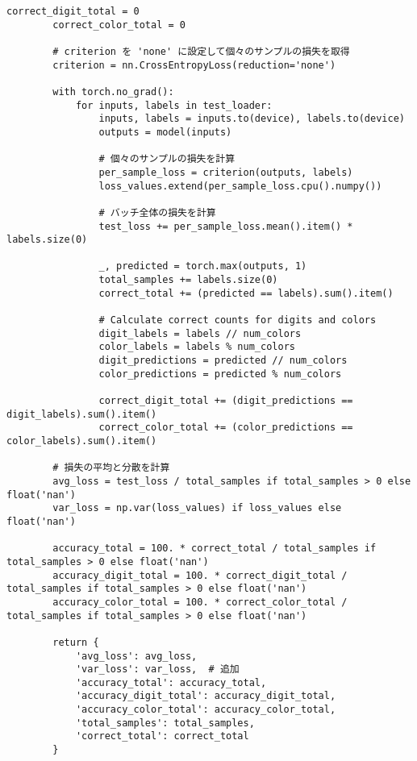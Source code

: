\begin{lstlisting}[style=pythonstyle, caption={Program Example}]
        correct_digit_total = 0
        correct_color_total = 0
    
        # criterion を 'none' に設定して個々のサンプルの損失を取得
        criterion = nn.CrossEntropyLoss(reduction='none')
    
        with torch.no_grad():
            for inputs, labels in test_loader:
                inputs, labels = inputs.to(device), labels.to(device)
                outputs = model(inputs)
                
                # 個々のサンプルの損失を計算
                per_sample_loss = criterion(outputs, labels)
                loss_values.extend(per_sample_loss.cpu().numpy())
                
                # バッチ全体の損失を計算
                test_loss += per_sample_loss.mean().item() * labels.size(0)
                
                _, predicted = torch.max(outputs, 1)
                total_samples += labels.size(0)
                correct_total += (predicted == labels).sum().item()
    
                # Calculate correct counts for digits and colors
                digit_labels = labels // num_colors
                color_labels = labels % num_colors
                digit_predictions = predicted // num_colors
                color_predictions = predicted % num_colors
    
                correct_digit_total += (digit_predictions == digit_labels).sum().item()
                correct_color_total += (color_predictions == color_labels).sum().item()
    
        # 損失の平均と分散を計算
        avg_loss = test_loss / total_samples if total_samples > 0 else float('nan')
        var_loss = np.var(loss_values) if loss_values else float('nan')
        
        accuracy_total = 100. * correct_total / total_samples if total_samples > 0 else float('nan')
        accuracy_digit_total = 100. * correct_digit_total / total_samples if total_samples > 0 else float('nan')
        accuracy_color_total = 100. * correct_color_total / total_samples if total_samples > 0 else float('nan')
    
        return {
            'avg_loss': avg_loss,
            'var_loss': var_loss,  # 追加
            'accuracy_total': accuracy_total,
            'accuracy_digit_total': accuracy_digit_total,
            'accuracy_color_total': accuracy_color_total,
            'total_samples': total_samples,
            'correct_total': correct_total
        }
        

\end{lstlisting}
